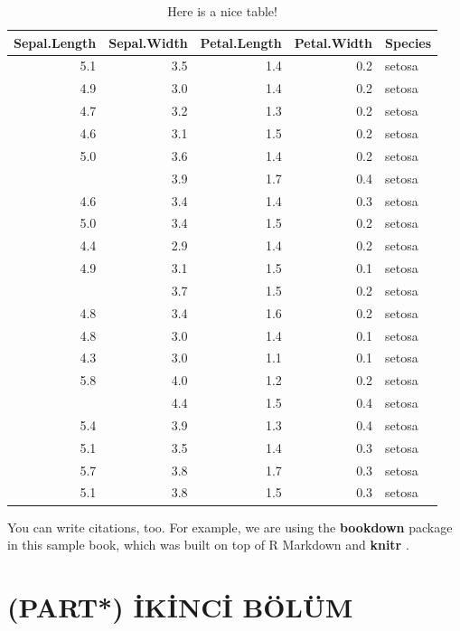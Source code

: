 \documentclass[
]{book}
\begin{document}
\begin{table}

\caption{\label{tab:nice-tab}Here is a nice table!}
\centering
\begin{tabular}[t]{rrrrl}
\toprule
Sepal.Length & Sepal.Width & Petal.Length & Petal.Width & Species\\
\midrule
5.1 & 3.5 & 1.4 & 0.2 & setosa\\
4.9 & 3.0 & 1.4 & 0.2 & setosa\\
4.7 & 3.2 & 1.3 & 0.2 & setosa\\
4.6 & 3.1 & 1.5 & 0.2 & setosa\\
5.0 & 3.6 & 1.4 & 0.2 & setosa\\
\addlinespace
5.4 & 3.9 & 1.7 & 0.4 & setosa\\
4.6 & 3.4 & 1.4 & 0.3 & setosa\\
5.0 & 3.4 & 1.5 & 0.2 & setosa\\
4.4 & 2.9 & 1.4 & 0.2 & setosa\\
4.9 & 3.1 & 1.5 & 0.1 & setosa\\
\addlinespace
5.4 & 3.7 & 1.5 & 0.2 & setosa\\
4.8 & 3.4 & 1.6 & 0.2 & setosa\\
4.8 & 3.0 & 1.4 & 0.1 & setosa\\
4.3 & 3.0 & 1.1 & 0.1 & setosa\\
5.8 & 4.0 & 1.2 & 0.2 & setosa\\
\addlinespace
5.7 & 4.4 & 1.5 & 0.4 & setosa\\
5.4 & 3.9 & 1.3 & 0.4 & setosa\\
5.1 & 3.5 & 1.4 & 0.3 & setosa\\
5.7 & 3.8 & 1.7 & 0.3 & setosa\\
5.1 & 3.8 & 1.5 & 0.3 & setosa\\
\bottomrule
\end{tabular}
\end{table}

You can write citations, too. For example, we are using the \textbf{bookdown} package \citep{R-bookdown} in this sample book, which was built on top of R Markdown and \textbf{knitr} \citep{xie2015}.

\hypertarget{part-ikinci-buxf6luxfcm}{%
\chapter*{\texorpdfstring{(PART*) \textbf{İKİNCİ BÖLÜM}}{(PART*) İKİNCİ BÖLÜM}}\label{part-ikinci-buxf6luxfcm}}
\end{document}
